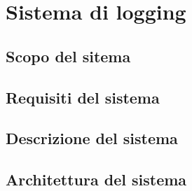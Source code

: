 \chapter{Sistema di logging}\label{cap:microservizio-logging}

\section{Scopo del sitema}



\section{Requisiti del sistema}
\section{Descrizione del sistema}
\section{Architettura del sistema}